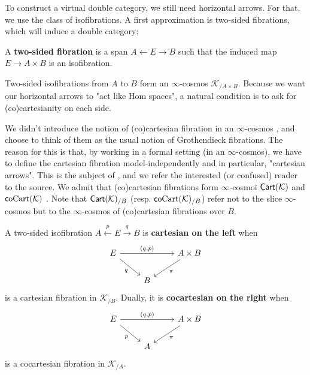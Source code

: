 \documentclass[10pt,a4paper]{article}
\newcommand{\ca}[1]{\mathcal{#1}}
\newcommand{\cat}[1]{\textcat{#1}}
\newcommand{\textcat}[1]{{\normalfont\textsf{#1}}}
\newcommand{\from}{\leftarrow}
\DeclareMathOperator{\Cart}{\cat{Cart}}
\DeclareMathOperator{\coCart}{\cat coCart}
\theoremstyle{plain}
\theoremstyle{definition}
\theoremstyle{remark}
\begin{document}
To construct a virtual double category, we still need horizontal arrows. For that, we use the class of isofibrations. A first approximation is two-sided fibrations, which will induce a double category:

\begin{definition}
    A \textbf{two-sided fibration} is a span $A \from E \to B$ such that the induced map $E \to A\times B$ is an isofibration.
\end{definition}

Two-sided isofibrations from $A$ to $B$ form an $\infty$-cosmos $\ca K_{/A\times B}$. Because we want our horizontal arrows to "act like Hom spaces", a natural condition is to ask for (co)cartesianity on each side.

We didn't introduce the notion of (co)cartesian fibration in an $\infty$-cosmos \cite[Definition 5.2.1]{riehl_verity}, and choose to think of them as the usual notion of Grothendieck fibrations. The reason for this is that, by working in a formal setting (in an $\infty$-cosmos), we have to define the cartesian fibration model-independently and in particular, "cartesian arrows". This is the subject of \cite[Section 5]{riehl_verity}, and we refer the interested (or confused) reader to the source. We admit that (co)cartesian fibrations form $\infty$-cosmoï $\Cart(\ca K)$ and $\coCart(\ca K)$ \cite[Section 6]{riehl_verity}. Note that $\Cart(\ca K)_{/B}$ (resp. $\coCart(\ca K)_{/B}$) refer not to the slice $\infty$-cosmos but to the $\infty$-cosmos of (co)cartesian fibrations over $B$.

\begin{definition}
    A two-sided isofibration $A \xleftarrow{p} E \xrightarrow{q} B$ is \textbf{cartesian on the left} when
    \[\begin{tikzcd}
        \ar[dr, "q"'] E \ar[rr, "{(q, p)}"] && A\times B \ar[dl, "\pi"]\\
                            & B
    \end{tikzcd}\]
    is a cartesian fibration in $\ca K_{/B}$. Dually, it is \textbf{cocartesian on the right} when
    \[\begin{tikzcd}
        \ar[dr, "p"'] E \ar[rr, "{(q, p)}"] && A\times B \ar[dl, "\pi"]\\
                            & A
    \end{tikzcd}\]
    is a cocartesian fibration in $\ca K_{/A}$.
\end{definition}
\end{document}
